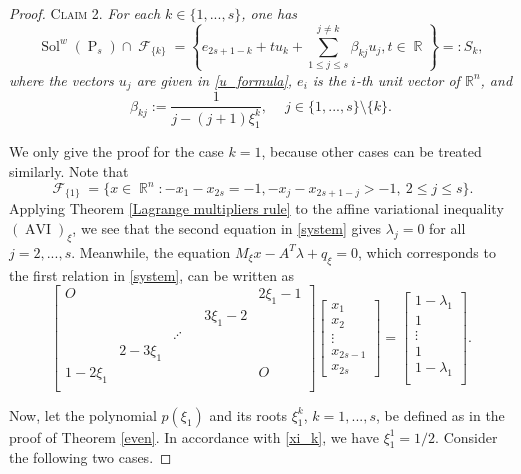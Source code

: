 \documentclass[smallextended,envcountsect]{svjour3}       %
\DeclareMathOperator{\Sol}{Sol}
\DeclareMathOperator{\AVI}{AVI}
\DeclareMathOperator{\Pa}{P}
\DeclareMathOperator{\R}{\mathbb{R}}
\DeclareMathOperator{\F}{\mathcal{F}}
\begin{document}
\begin{proof}
\smallskip
\noindent \textsc{Claim 2.} \textit{For each $k\in\{1,...,s\}$, one has
\begin{equation}\label{Si}
	\Sol^w(\Pa_s)\cap \F_{\{k\}}=\left\lbrace e_{2s+1-k}+ tu_k+\sum_{1\leq j \leq s}^{j\neq k}\beta_{kj}u_j, t\in \R\right\rbrace=:S_k,
	\end{equation}
where the vectors $u_j$ are given in \eqref{u_formula}, $e_i$ is the $i$-th unit vector of $\mathbb R^n$, and
$$\beta_{kj}:=\frac{1}{j-(j+1)\xi_1^k},\quad \ j\in\{1,...,s\}\setminus\{k\}.$$}


\smallskip
We only give the proof for the case $k=1$, because other cases can be treated similarly. Note that
	$$\F_{\{1\}}=\{x\in \R^n:-x_1-x_{2s}= -1,-x_j -x_{2s+1-j}> -1, \ 2\leq j\leq s\}.$$ Applying Theorem \ref{Lagrange multipliers rule} to the affine variational inequality $(\AVI)_\xi$, we see that the second equation in
\eqref{system} gives $\lambda_j =0$ for all $j=2,..., s$. Meanwhile, the equation $M_{\xi}x-A^T\lambda+q_{\xi} =0$, which corresponds to the first relation in \eqref{system}, can be written as
\begin{equation}\label{system-f1}
	\begin{bmatrix}
O&  &  &&  & 2\xi_1-1\\ 
&   & & 	  & 3\xi_1-2 &	\\ 
&    &\iddots  & &  &	\\ 
&  2-3\xi_1& &&   &\\ 
1-2\xi_1& &&& &  O\\ 
\end{bmatrix} \begin{bmatrix}
x_1 \\ 
x_2 \\ 
\vdots\\
x_{2s-1}\\
x_{2s}
\end{bmatrix}=\begin{bmatrix}
1-\lambda_1\\ 
1\\
\vdots\\
1\\
1-\lambda_1 \\
\end{bmatrix}.
\end{equation}

Now, let the polynomial $p(\xi_1)$ and its roots $\xi_1^k$, $k=1,...,s$, be defined as in the proof of Theorem \ref{even}. In accordance with \eqref{xi_k}, we have $\xi_1^1=1/2$. Consider the following two cases.


\end{proof}
\end{document}
